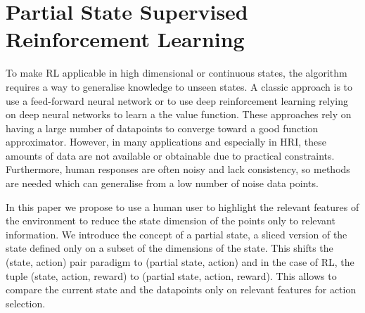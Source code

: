\documentclass[letterpaper]{article} %
\begin{document}
\section{Partial State Supervised Reinforcement Learning}

To make RL applicable in high dimensional or continuous states, the algorithm
requires a way to generalise knowledge to unseen states. 
A classic approach is to use a feed-forward neural
network or to use deep reinforcement learning relying on deep neural
networks to learn a the value function. 
These approaches rely on having a large number of
datapoints to converge toward a good function approximator. However, 
 in many applications and especially in HRI, these amounts of data are not
available or obtainable due to practical constraints. Furthermore, human responses are often noisy and lack consistency, so methods are needed which can generalise from a low number of noise data points.


In this paper we propose to use a human user to highlight the relevant features of
the environment to reduce the state dimension of the points only to relevant
information.
We introduce the concept of a partial state, a sliced version of the state defined
only on a subset of the dimensions of the state. This shifts the (state, action)
pair paradigm to (partial state, action)  
and in the case of RL, the tuple (state, action, reward) to (partial state,
action, reward). This allows to compare the current state and the
datapoints only on relevant features for action selection.
\end{document}
